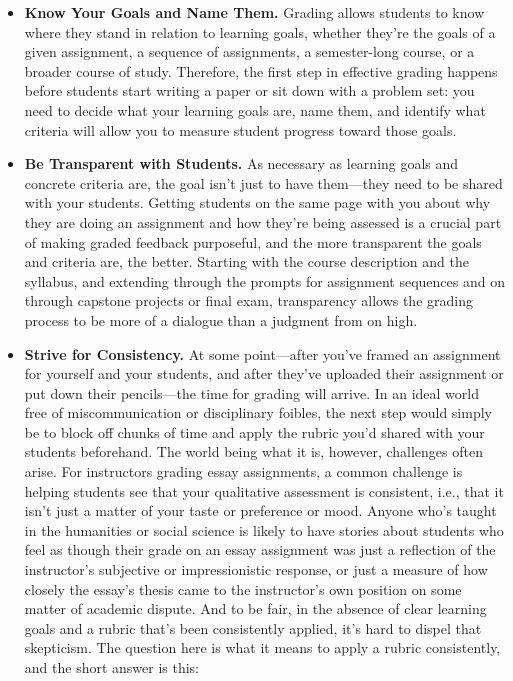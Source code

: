 \begin{itemize}
\item \textbf{Know Your Goals and Name Them.} Grading allows students to know where they stand in relation to learning goals, whether they’re the goals of a given assignment, a sequence of assignments, a semester-long course, or a broader course of study. Therefore, the first step in effective grading happens before students start writing a paper or sit down with a problem set: you need to decide what your learning goals are, name them, and identify what criteria will allow you to measure student progress toward those goals.
  
\item \textbf{Be Transparent with Students.} As necessary as learning goals and concrete criteria are, the goal isn’t just to have them—they need to be shared with your students. Getting students on the same page with you about why they are doing an assignment and how they’re being assessed is a crucial part of making graded feedback purposeful, and the more transparent the goals and criteria are, the better. Starting with the course description and the syllabus, and extending through the prompts for assignment sequences and on through capstone projects or final exam, transparency allows the grading process to be more of a dialogue than a judgment from on high.
  
\item \textbf{Strive for Consistency.} At some point—after you’ve framed an assignment for yourself and your students, and after they’ve uploaded their assignment or put down their pencils—the time for grading will arrive. In an ideal world free of miscommunication or disciplinary foibles, the next step would simply be to block off chunks of time and apply the rubric you’d shared with your students beforehand. The world being what it is, however, challenges often arise. For instructors grading essay assignments, a common challenge is helping students see that your qualitative assessment is consistent, i.e., that it isn’t just a matter of your taste or preference or mood. Anyone who’s taught in the humanities or social science is likely to have stories about students who feel as though their grade on an essay assignment was just a reflection of the instructor’s subjective or impressionistic response, or just a measure of how closely the essay’s thesis came to the instructor’s own position on some matter of academic dispute. And to be fair, in the absence of clear learning goals and a rubric that’s been consistently applied, it’s hard to dispel that skepticism. The question here is what it means to apply a rubric consistently, and the short answer is this:


\end{itemize}
